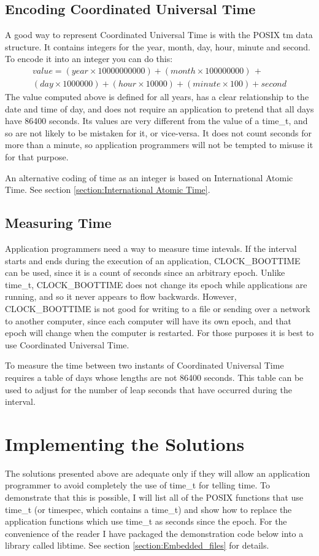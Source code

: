 \documentclass[letterpaper,twoside]{article}
\begin{document}
\subsection{Encoding Coordinated Universal Time}
A good way to represent Coordinated Universal Time is with the
POSIX {\ttfamily tm} data
structure.  It contains integers for the year, month, day, hour, minute
and second.  To encode it into an integer you can do this:
\begin{multline*}
  value = (year \times 10000000000) + (month \times 100000000) \, + \\
  (day \times 1000000) + (hour \times 10000) + (minute \times 100) + second
\end{multline*}
The value computed above is defined for all years, has a clear relationship
to the date and time of day, and does not require an application to pretend
that all days have \num{86400} seconds.  Its values are very different from
the value of a {\ttfamily time\_t}, and so are not likely to be mistaken for it,
or vice-versa.  It does not count seconds for more than a minute, so
application programmers will not be tempted to misuse it for that purpose.

An alternative coding of time as an integer is based on International
Atomic Time.  See section \ref{section:International Atomic Time}.

\subsection{Measuring Time}
Application programmers need a way to measure time intevals.
If the interval starts and ends during the execution of an application,
CLOCK\_BOOTTIME
can be used, since it is a count of seconds since an arbitrary epoch.
Unlike {\ttfamily time\_t}, CLOCK\_BOOTTIME does not change its epoch while
applications are running, and so it never appears to flow
backwards.  However, CLOCK\_BOOTTIME is not good for writing to a file
or sending
over a network to another computer, since each computer will have
its own epoch, and that epoch will change when the computer is restarted.
For those purposes it is best to use Coordinated Universal Time.

To measure the time between two instants of Coordinated Universal Time
requires a table of days whose lengths are not \num{86400} seconds.
This table
can be used to adjust for the number of leap seconds that have occurred
during the interval.

\section{Implementing the Solutions}
The solutions presented above are adequate only if they will allow an
application
programmer to avoid completely the use of {\ttfamily time\_t} for telling time.
To demonstrate that this is possible,
I will list all of the POSIX functions 
that use {\ttfamily time\_t}
(or timespec, which contains a {\ttfamily time\_t}) 
and show how to
replace the application functions which use {\ttfamily time\_t} as
seconds since the epoch.
For the convenience of the reader I have packaged the demonstration code
below into a library called {\ttfamily libtime}.
See section \ref{section:Embedded_files} for details.
\end{document}
